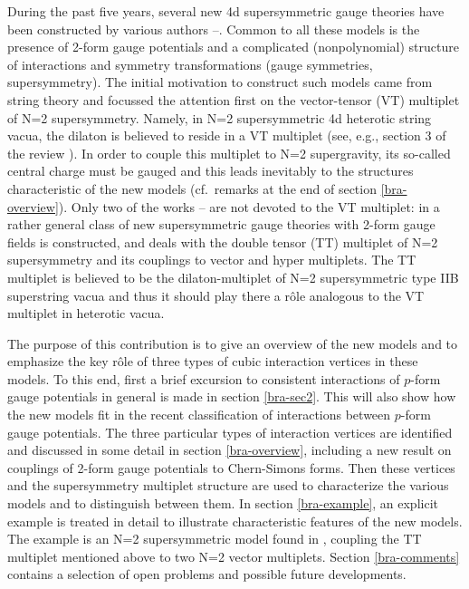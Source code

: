 \documentclass[a4paper,12pt]{article}
\begin{document}
During the past five years, several new
4d supersymmetric gauge theories have been constructed
by various authors 
\cite{bra-1}--\cite{bra-13}.
Common to all these
models is the presence of 2-form gauge potentials
and a complicated (nonpolynomial) structure of
interactions and symmetry transformations (gauge symmetries, supersymmetry).
The initial motivation to construct such models came from
string theory and focussed the attention first
on the vector-tensor (VT) multiplet
\cite{bra-VT1,bra-VT2} of N=2 supersymmetry. 
Namely, in N=2 supersymmetric 4d heterotic string vacua,
the dilaton is believed to reside in a VT multiplet
(see, e.g., section 3 of the review \cite{bra-LF}). 
In order to couple this multiplet
to N=2 supergravity, its so-called central charge must be gauged
and this leads inevitably to the structures
characteristic of the new models (cf.\ remarks at the end
of section \ref{bra-overview}).
Only two of the works \cite{bra-1}--\cite{bra-13} are not
devoted to the VT multiplet: in \cite{bra-11}
a rather general class of new supersymmetric gauge theories
with 2-form gauge fields is constructed, and \cite{bra-13}
deals with the double tensor (TT) multiplet
of N=2 supersymmetry and its couplings to vector and hyper multiplets.
The TT multiplet is believed to be the dilaton-multiplet
of N=2 supersymmetric type IIB superstring vacua \cite{bra-LF} and thus 
it should play there a r\^ole analogous to the VT multiplet 
in heterotic vacua.

The purpose of this contribution is to give an overview
of the new models and to emphasize the key r\^ole of
three types of cubic interaction vertices in these models.
To this end, first a brief
excursion to consistent interactions of $p$-form gauge potentials
in general is made in section \ref{bra-sec2}. This will also show
how the new models fit in the recent
classification \cite{bra-HK1,bra-HK2,bra-HK3} of interactions
between $p$-form gauge potentials. The
three particular types of interaction vertices are identified
and discussed in some detail in section \ref{bra-overview},
including a new result on couplings of 2-form gauge potentials
to Chern-Simons forms. Then
these vertices and the supersymmetry multiplet structure
are used to characterize the various
models and to distinguish between them.
In section \ref{bra-example}, an explicit example
is treated in detail to illustrate characteristic features 
of the new models.
The example is an N=2 supersymmetric model 
found in \cite{bra-13},
coupling the TT multiplet mentioned above
to two N=2 vector multiplets. Section \ref{bra-comments} contains 
a selection of open problems and possible
future developments.
\end{document}
